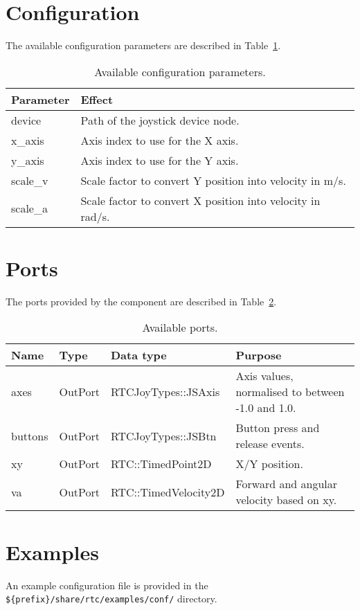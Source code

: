 \documentclass[a4paper,10pt]{article}
\begin{document}
\section{Configuration}
\label{sec:configuration}

The available configuration parameters are described in
Table~\ref{tab:config_params}.

\begin{table}[t]
  \centering
  \begin{tabularx}{\columnwidth}{lX}
    \toprule
    Parameter & Effect \\
    \midrule
    device & Path of the joystick device node. \\
    x\_axis & Axis index to use for the X axis. \\
    y\_axis & Axis index to use for the Y axis. \\
    scale\_v & Scale factor to convert Y position into velocity in m/s. \\
    scale\_a & Scale factor to convert X position into velocity in rad/s. \\
    \bottomrule
  \end{tabularx}
  \caption{Available configuration parameters.}
  \label{tab:config_params}
\end{table}

\section{Ports}
\label{sec:port}

The ports provided by the component are described in Table~\ref{tab:ports}.

\begin{table}[t]
  \centering
  \begin{tabularx}{\columnwidth}{lllX}
    \toprule
    Name & Type & Data type & Purpose \\
    \midrule
    axes & OutPort & RTCJoyTypes::JSAxis & Axis values, normalised to between -1.0 and 1.0. \\
    buttons & OutPort & RTCJoyTypes::JSBtn & Button press and release events. \\
    xy & OutPort & RTC::TimedPoint2D & X/Y position. \\
    va & OutPort & RTC::TimedVelocity2D & Forward and angular velocity based on xy. \\
    \bottomrule
  \end{tabularx}
  \caption{Available ports.}
  \label{tab:ports}
\end{table}

\section{Examples}
\label{sec:examples}

An example configuration file is provided in the
\verb|${prefix}/share/rtc/examples/conf/| directory.

\end{document}
